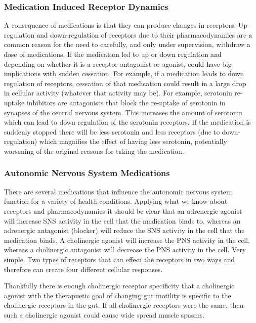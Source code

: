 \subsubsection{Medication Induced Receptor Dynamics}
A consequence of medications is that they can produce changes in receptors. Up-regulation and down-regulation of receptors due to their pharmacodynamics are a common reason for the need to carefully, and only under supervision, withdraw a dose of medications. If the medication led to up or down regulation and depending on whether it is a receptor antagonist or agonist, could have big implications with sudden cessation. For example, if a medication leads to down regulation of receptors, cessation of that medication could result in a large drop in cellular activity (whatever that activity may be). For example, serotonin re-uptake inhibitors are antagonists that block the re-uptake of serotonin in synapses of the central nervous system. This increases the amount of serotonin which can lead to down-regulation of the serotonin receptors. If the medication is suddenly stopped there will be less serotonin and less receptors (due to down-regulation) which magnifies the effect of having less serotonin, potentially worsening of the original reasons for taking the medication. 

\subsubsection{Autonomic Nervous System Medications}

There are several medications that influence the autonomic nervous system function for a variety of health conditions. Applying what we know about receptors and pharmacodynamics it should be clear that an adrenergic agonist will increase SNS activity in the cell that the medication binds to, whereas an adrenergic antagonist (blocker) will reduce the SNS activity in the cell that the medication binds. A cholinergic agonist will increase the PNS activity in the cell, whereas a cholinergic antagonist will decrease the PNS activity in the cell. Very simple. Two types of receptors that can effect the receptors in two ways and therefore can create four different cellular responses. 

Thankfully there is enough cholinergic receptor specificity that a cholinergic agonist with the therapuetic goal of changing gut motility is specific to the cholinergic receptors in the gut. If all cholinergic receptors were the same, then such a cholinergic agonist could cause wide spread muscle spasms.

